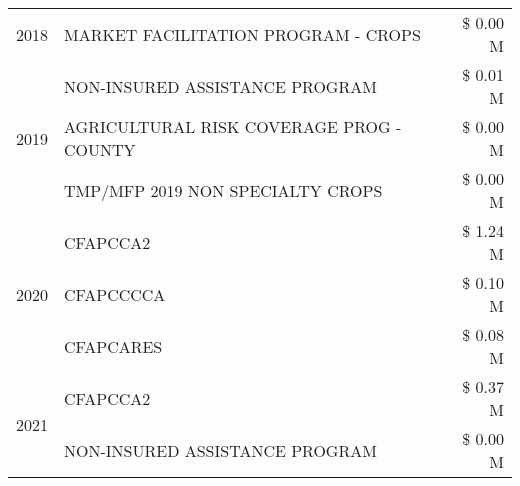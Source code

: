 \begin{tabular}{llr}
\cline{1-3}
2018 & MARKET FACILITATION PROGRAM - CROPS & \$ 0.00 M \\
\cline{1-3}
\multirow[t]{3}{*}{2019} & NON-INSURED ASSISTANCE PROGRAM & \$ 0.01 M \\
 & AGRICULTURAL RISK COVERAGE PROG - COUNTY & \$ 0.00 M \\
 & TMP/MFP 2019 NON SPECIALTY CROPS & \$ 0.00 M \\
\cline{1-3}
\multirow[t]{3}{*}{2020} & CFAPCCA2 & \$ 1.24 M \\
 & CFAPCCCCA & \$ 0.10 M \\
 & CFAPCARES & \$ 0.08 M \\
\cline{1-3}
\multirow[t]{2}{*}{2021} & CFAPCCA2 & \$ 0.37 M \\
 & NON-INSURED ASSISTANCE PROGRAM & \$ 0.00 M \\
\cline{1-3}
\bottomrule
\end{tabular}
